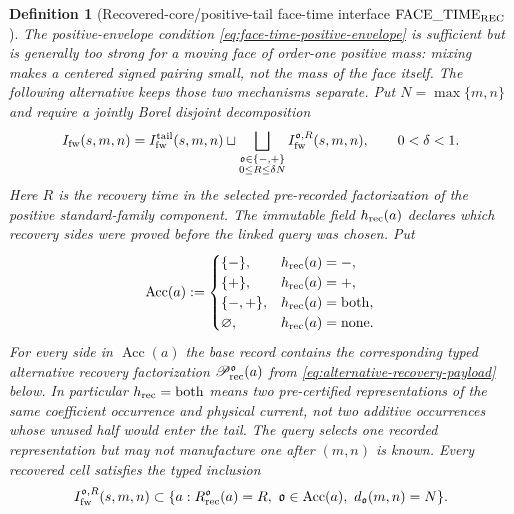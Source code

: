 \documentclass[11pt]{article}
\newtheorem{definition}[theorem]{Definition}
\begin{document}
\begin{definition}[Recovered-core/positive-tail face-time interface
$\mathrm{FACE\_TIME}_{\rm REC}$]
\label{def:face-time-recovered}
The positive-envelope condition
\eqref{eq:face-time-positive-envelope} is sufficient but is generally too
strong for a moving face of order-one positive mass: mixing makes a
\emph{centered signed pairing} small, not the mass of the face itself.  The
following alternative keeps those two mechanisms separate.  Put
$N=\max\{m,n\}$ and require a jointly Borel disjoint decomposition
\begin{equation}
\label{eq:face-time-recovered-split}
 I_{\rm fw}(s,m,n)=I_{\rm fw}^{\rm tail}(s,m,n)
 \sqcup\bigsqcup_{\substack{\mathfrak o\in\{-,+\}\\0\le R\le\delta N}}
 I_{\rm fw}^{\mathfrak o,R}(s,m,n),
 \qquad 0<\delta<1.
\end{equation}
Here $R$ is the recovery time in the selected pre-recorded factorization of
the positive standard-family component.  The immutable field
$h_{\rm rec}(a)$ declares which recovery
sides were proved before the linked query was chosen.  Put
\begin{equation}
\label{eq:face-recovery-access-set}
 \operatorname{Acc}(a):=
 \begin{cases}
  \{-\},&h_{\rm rec}(a)=-,\\
  \{+\},&h_{\rm rec}(a)=+,\\
  \{-,+\},&h_{\rm rec}(a)=\mathrm{both},\\
  \varnothing,&h_{\rm rec}(a)=\mathrm{none}.
 \end{cases}
\end{equation}
For every side in $\operatorname{Acc}(a)$ the base record contains the
corresponding typed alternative recovery factorization
$\mathscr P_{\rm rec}^{\mathfrak o}(a)$ from
\eqref{eq:alternative-recovery-payload} below.  In particular
$h_{\rm rec}=\mathrm{both}$ means two pre-certified representations of the
\emph{same} coefficient occurrence and physical current, not two additive
occurrences whose unused half would enter the tail.  The query selects one
recorded representation but may not manufacture one after $(m,n)$ is
known.  Every recovered cell satisfies the typed inclusion
\begin{equation}
\label{eq:face-time-recovery-record-compatibility}
 I_{\rm fw}^{\mathfrak o,R}(s,m,n)
 \subset\{a:R_{\rm rec}^{\mathfrak o}(a)=R,\
                 \mathfrak o\in\operatorname{Acc}(a),\
                 d_{\mathfrak o}(m,n)=N\}.
\end{equation}

\end{definition}
\end{document}
